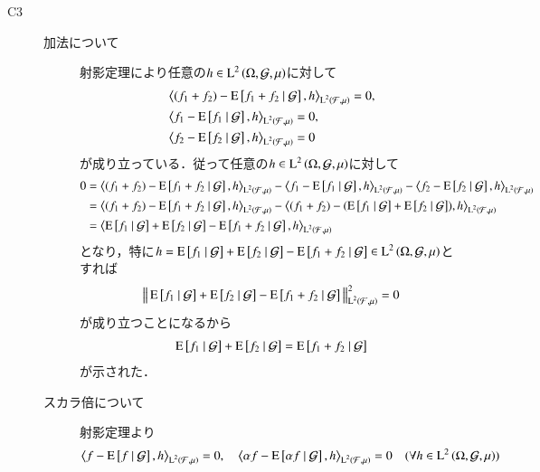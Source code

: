 \begin{prf}
\begin{description}
			\item[C3] 
				\begin{description}
					\item[加法について]
						射影定理により任意の$h \in \operatorname{L}^{2} \left(\Omega, \mathcal{G},\mu\right)$に対して
						\begin{align}
							&\inprod<(f_1 + f_2) - \cexp{f_1 + f_2}{\mathcal{G}}, h>_{\Lp{2}{\mathcal{F},\mu}} = 0, \\
							&\inprod<f_1 - \cexp{f_1}{\mathcal{G}}, h>_{\Lp{2}{\mathcal{F},\mu}} = 0, \\
							&\inprod<f_2 - \cexp{f_2}{\mathcal{G}}, h>_{\Lp{2}{\mathcal{F},\mu}} = 0
						\end{align}
						が成り立っている．従って任意の$h \in \operatorname{L}^{2} \left(\Omega, \mathcal{G},\mu\right)$に対して
						\begin{align}
							0 &= \inprod<(f_1 + f_2) - \cexp{f_1 + f_2}{\mathcal{G}}, h>_{\Lp{2}{\mathcal{F},\mu}} - \inprod<f_1 - \cexp{f_1}{\mathcal{G}}, h>_{\Lp{2}{\mathcal{F},\mu}} - \inprod<f_2 - \cexp{f_2}{\mathcal{G}}, h>_{\Lp{2}{\mathcal{F},\mu}} \\
							&= \inprod<(f_1 + f_2) - \cexp{f_1 + f_2}{\mathcal{G}}, h>_{\Lp{2}{\mathcal{F},\mu}} - \inprod<(f_1 + f_2) - (\cexp{f_1}{\mathcal{G}} + \cexp{f_2}{\mathcal{G}}), h>_{\Lp{2}{\mathcal{F},\mu}} \\
							&= \inprod<\cexp{f_1}{\mathcal{G}} + \cexp{f_2}{\mathcal{G}} - \cexp{f_1 + f_2}{\mathcal{G}}, h>_{\Lp{2}{\mathcal{F},\mu}}
						\end{align}
						となり，特に$h = \operatorname{E} \left[ f_1 \ \middle|\ \mathcal{G} \right] + \operatorname{E} \left[ f_2 \ \middle|\ \mathcal{G} \right] - \operatorname{E} \left[ f_1 + f_2 \ \middle|\ \mathcal{G} \right] \in \operatorname{L}^{2} \left(\Omega, \mathcal{G},\mu\right)$とすれば
						\begin{align}
							\left\|\, \operatorname{E} \left[ f_1 \ \middle|\ \mathcal{G} \right] + \operatorname{E} \left[ f_2 \ \middle|\ \mathcal{G} \right] - \operatorname{E} \left[ f_1 + f_2 \ \middle|\ \mathcal{G} \right]\, \right\|_{\operatorname{L}^{2} \left(\mathcal{F},\mu\right)}^2 = 0
						\end{align}
						が成り立つことになるから
						\begin{align}
							\operatorname{E} \left[ f_1 \ \middle|\ \mathcal{G} \right] + \operatorname{E} \left[ f_2 \ \middle|\ \mathcal{G} \right] = \operatorname{E} \left[ f_1 + f_2 \ \middle|\ \mathcal{G} \right]
						\end{align}
						が示された．
					\item[スカラ倍について]
						射影定理より
							\begin{align}
								\inprod<f - \cexp{f}{\mathcal{G}}, h>_{\Lp{2}{\mathcal{F},\mu}} = 0, \quad \inprod<\alpha f - \cexp{\alpha f}{\mathcal{G}}, h>_{\Lp{2}{\mathcal{F},\mu}} = 0 \quad (\forall h \in \Lp{2}{\Omega, \mathcal{G},\mu})
							\end{align}

\end{description}
\end{description}
\end{prf}
